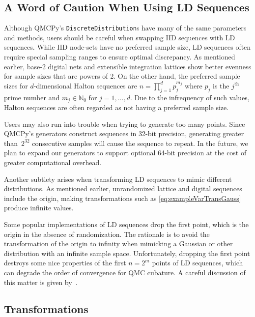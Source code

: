 \documentclass[graybox]{svmult}
\begin{document}
\subsection{A Word of Caution When Using LD Sequences}

Although QMCPy's \texttt{DiscreteDistribution}s have many of the same parameters and methods, users should be careful when swapping IID sequences with LD sequences. While IID node-sets have no preferred sample size, LD sequences often require special sampling ranges to ensure optimal discrepancy. As mentioned  earlier, base-2 digital nets and extensible integration lattices show better evenness for sample sizes that are powers of 2. On the other hand, the preferred sample sizes for $d$-dimensional Halton sequences are $n = \prod_{j=1}^d p^{m_j}_j$ where $p_j$ is the $j^{\text{th}}$ prime number and $m_j \in \mathbb{N}_0$ for $j=1,\dots,d$. Due to the infrequency of such values, Halton sequences are often regarded as not having a preferred sample size.  

Users may also run into trouble when trying to generate too many points. Since QMCPy's generators construct sequences in 32-bit precision, generating greater than~$2^{32}$ consecutive samples will cause the sequence to repeat. In the future, we plan to expand our generators to support optional 64-bit precision at the cost of greater computational overhead.

Another subtlety arises when transforming LD sequences to mimic different distributions. As mentioned earlier, unrandomized lattice and digital sequences include the origin, making transformations such as \eqref{eq:exampleVarTransGauss} produce infinite values.  

Some popular implementations of LD sequences drop the first point, which is the origin in the absence of randomization.  The rationale is to avoid the transformation of the origin to infinity when mimicking a Gaussian or other distribution with an infinite sample space.  Unfortunately, dropping the first point destroys some nice properties of the first $n = 2^m$ points of LD sequences, which can degrade the order of convergence for QMC cubature. A careful  discussion of this matter is given by~\cite{owen2020dropping}.

\subsection{Transformations}
\end{document}
